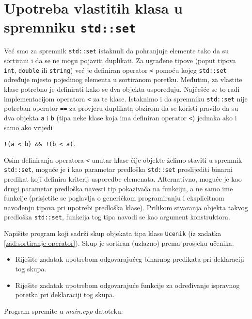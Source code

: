 \section{Upotreba vlastitih klasa u spremniku \texttt{std::set}}

Već smo za spremnik \texttt{std::set} istaknuli da pohranjuje elemente tako da su sortirani i da se ne mogu pojaviti duplikati.
Za ugrađene tipove (poput tipova \texttt{int}, \texttt{double} ili \texttt{string}) već je definiran
operator \texttt{<} pomoću kojeg \texttt{std::set}
određuje mjesto pojedinog elementa u sortiranom poretku.
Međutim, za vlastite klase potrebno je definirati kako se dva objekta uspoređuju. 
Najčešće se to radi implementacijom operatora \texttt{<} za te klase.
Istaknimo i da spremniku \texttt{std::set} nije potreban operator
\texttt{==} za provjeru duplikata obzirom da
se koristi pravilo da su dva objekta \texttt{a} i \texttt{b}
(tipa neke klase koja ima definiran operator \texttt{<})
jednaka ako i samo ako vrijedi
\begin{center}
    \texttt{!(a < b) \&\& !(b < a)}.
\end{center}

Osim definiranja operatora \texttt{<} unutar klase čije objekte želimo staviti u spremnik \texttt{std::set},
moguće je i kao parametar predloška \texttt{std::set}
proslijediti binarni predikat koji definira kriterij usporedbe elemenata.
Alternativno, moguće je kao drugi parametar predloška navesti tip pokazivača na funkciju, a ne samo ime funkcije
(prisjetite se poglavlja o generičkom programiranju i eksplicitnom navođenju tipova pri upotrebi predloška klase).
Prilikom stvaranja objekta takvog predloška \texttt{std::set}, funkcija tog tipa navodi
se kao argument konstruktora.


\begin{zadatak}\label{zad:skup-ucenika}
Napišite program koji sadrži skup objekata tipa klase \texttt{Ucenik}
(iz zadatka \ref{zad:sortiranje-operator}).
Skup je sortiran (uzlazno) prema prosjeku učenika.
\begin{itemize}
    \item[(a)]
    Riješite zadatak upotrebom odgovarajućeg binarnog predikata pri deklaraciji tog skupa.
    \item[(b)]
    Riješite zadatak upotrebom odgovarajuće funkcije za određivanje ispravnog poretka pri deklaraciji tog skupa.
\end{itemize}
Program spremite u \textit{main.cpp} datoteku.
\end{zadatak}


